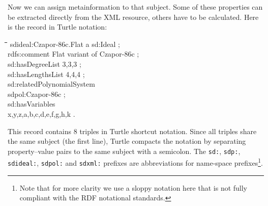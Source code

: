 \documentclass[a4paper,11pt]{article}
\newenvironment{code}{\par\small\tt\footnotesize \begin{tabbing}
\hskip12pt\=\hskip12pt\=\hskip12pt\=\hskip12pt\=\hskip5cm\=\hskip5cm\=\kill}
{\end{tabbing}\normalsize}
\def\dq{\symbol{34}}
\begin{document}
\begin{multicols}{2}
Now we can assign metainformation to that subject.  Some of these 
properties can be extracted directly from the XML resource, others have 
to be calculated.  Here is the record in Turtle notation:
\begin{code}
  sdideal:Czapor-86c.Flat a sd:Ideal ;\\\+ 
  rdfs:comment {\dq}Flat variant of Czapor-86c{\dq} ;\\
  sd:hasDegreeList {\dq}3,3,3{\dq} ;\\
  sd:hasLengthsList {\dq}4,4,4{\dq} ;\\
  sd:relatedPolynomialSystem\\\>  sdpol:Czapor-86c ;\\ 
  sd:hasVariables\\\>  {\dq}x,y,z,a,b,c,d,e,f,g,h,k{\dq} .
\end{code}
This record contains 8 triples in Turtle shortcut notation.  Since all triples
share the same subject (the first line), Turtle compacts the notation by
separating property--value pairs to the same subject with a semicolon.  The
\texttt{sd:}, \texttt{sdp:}, \texttt{sdideal:}, \texttt{sdpol:} and
\texttt{sdxml:} prefixes are abbreviations for name-space
prefixes\footnote{Note that for more clarity we use a sloppy notation here that
  is not fully compliant with the RDF notational standards. }.


\end{multicols}
\end{document}
